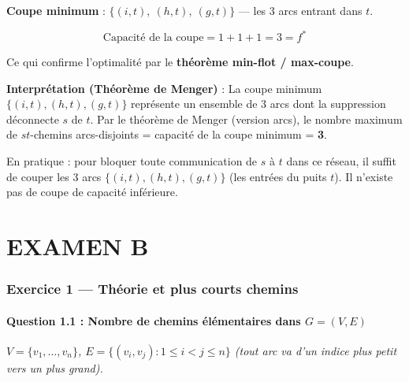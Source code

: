 \documentclass[12pt,a4paper]{article}
\begin{document}
\begin{solution}
\textbf{Coupe minimum} : $\{(i,t),\ (h,t),\ (g,t)\}$ --- les 3 arcs entrant dans $t$.

\[
\text{Capacité de la coupe} = 1 + 1 + 1 = 3 = f^*
\]

Ce qui confirme l'optimalité par le \textbf{théorème min-flot / max-coupe}.

\medskip
\textbf{Interprétation (Théorème de Menger)} : La coupe minimum $\{(i,t),(h,t),(g,t)\}$ représente un ensemble de 3 arcs dont la suppression déconnecte $s$ de $t$. Par le théorème de Menger (version arcs), le nombre maximum de $st$-chemins arcs-disjoints = capacité de la coupe minimum = \textbf{3}.

\begin{remarque}
En pratique : pour bloquer toute communication de $s$ à $t$ dans ce réseau, il suffit de couper les 3 arcs $\{(i,t),(h,t),(g,t)\}$ (les entrées du puits $t$). Il n'existe pas de coupe de capacité inférieure.
\end{remarque}
\end{solution}

\newpage
\part*{\color{titrebleu}EXAMEN B}

\section{Exercice 1 --- Théorie et plus courts chemins}

\subsection{Question 1.1 : Nombre de chemins élémentaires dans $G=(V,E)$}

\textit{$V=\{v_1,\ldots,v_n\}$, $E=\{(v_i,v_j) : 1 \le i < j \le n\}$ (tout arc va d'un indice plus petit vers un plus grand).}
\end{document}
